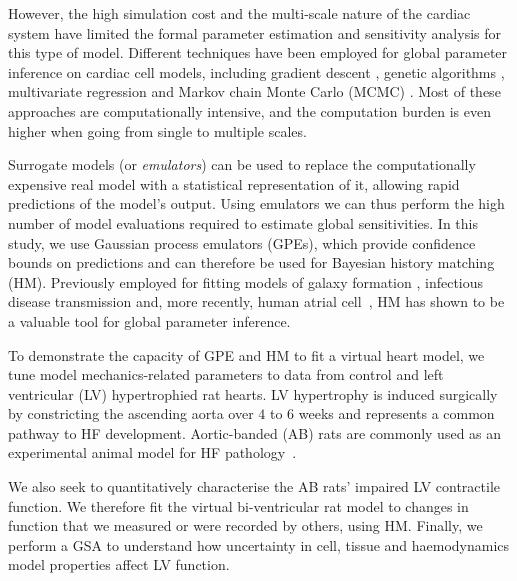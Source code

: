 However, the high simulation cost and the multi-scale nature of the cardiac system have limited the formal parameter estimation and sensitivity analysis for this type of model. Different techniques have been employed for global parameter inference on cardiac cell models, including gradient descent \cite{Dokos:2004}, genetic algorithms \cite{Groenendaal:2015}, multivariate regression \cite{Sarkar:2010} and Markov chain Monte Carlo (MCMC) \cite{Johnstone:2016}. Most of these approaches are computationally intensive, and the computation burden is even higher when going from single to multiple scales.

Surrogate models (or \textit{emulators}) can be used to replace the computationally expensive real model with a statistical representation of it, allowing rapid predictions of the model's output. Using emulators we can thus perform the high number of model evaluations required to estimate global sensitivities. In this study, we use Gaussian process emulators (GPEs), which provide confidence bounds on predictions and can therefore be used for Bayesian history matching (HM). Previously employed for fitting models of galaxy formation \cite{Vernon:2010}, infectious disease transmission \cite{Andrianakis:2015} and, more recently, human atrial cell~\cite{Coveney:2018}, HM has shown to be a valuable tool for global parameter inference.

To demonstrate the capacity of GPE and HM to fit a virtual heart model, we tune model mechanics-related parameters to data from control and left ventricular (LV) hypertrophied rat hearts. LV hypertrophy is induced surgically by constricting the ascending aorta over $4$ to $6$ weeks and represents a common pathway to HF development. Aortic-banded (AB) rats are commonly used as an experimental animal model for HF pathology~\cite{Camacho:2016}.

We also seek to quantitatively characterise the AB rats' impaired LV contractile function. We therefore fit the virtual bi-ventricular rat model to changes in function that we measured or were recorded by others, using HM. Finally, we perform a GSA to understand how uncertainty in cell, tissue and haemodynamics model properties affect LV function.